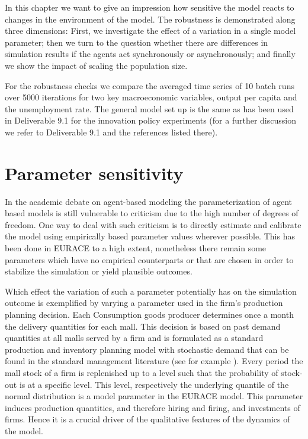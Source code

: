 In this chapter we want to give an impression how sensitive the model reacts to changes in the environment of the model. The robustness is demonstrated along three dimensions: First, we investigate the effect of a variation in a single model parameter; then we turn to the question whether there are differences in simulation results if the agents act synchronously or asynchronously; and finally we show the impact of scaling  the population size. 

For the robustness checks we compare the averaged time series of 10 batch runs over 5000 iterations for two key macroeconomic variables, output per capita and the unemployment rate. The general model set up is the same as has been used in Deliverable 9.1 for the innovation policy experiments (for a further discussion we refer to Deliverable 9.1 and the references listed there).  

\section{Parameter sensitivity}

In the academic debate on agent-based modeling the parameterization of agent based models is still vulnerable to criticism due to the high number of degrees of freedom. One way to deal with such criticism is to directly estimate and calibrate the model using empirically based parameter values wherever possible. This has been done in EURACE to a high extent, nonetheless there remain some parameters which have no empirical counterparts or that are chosen in order to stabilize the simulation or yield plausible outcomes. 

Which effect the variation of such a parameter potentially has on the simulation outcome is exemplified by varying a parameter used in the firm's production planning decision. Each Consumption goods producer determines once a month the delivery quantities for each mall. This decision is based on past demand quantities at all malls served by a firm and is formulated as a standard production and inventory planning model with stochastic demand that can be found in the standard management literature (see for example \cite{Nahmias_2008}). Every period the mall stock of a firm is replenished up to a level such that the probability of stock-out is at a specific level. This level, respectively the underlying quantile of the normal distribution is a model parameter in the EURACE model. This parameter induces production quantities, and therefore hiring and firing, and investments of firms. Hence it is a crucial driver of the qualitative features of the dynamics of the model.

